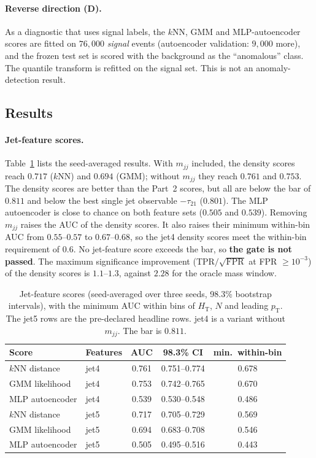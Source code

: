 \documentclass[11pt,a4paper]{article}
\newcommand{\pt}{\ensuremath{p_\mathrm{T}}\xspace}
\newcommand{\HT}{\ensuremath{H_\mathrm{T}}\xspace}
\newcommand{\mjj}{\ensuremath{m_{jj}}\xspace}
\newcommand{\tauTO}{\ensuremath{\tau_{21}}\xspace}
\begin{document}
\paragraph{Reverse direction (D).}
As a diagnostic that uses signal labels, the $k$NN, GMM and MLP-autoencoder scores are fitted on
$76{,}000$ \emph{signal} events (autoencoder validation: $9{,}000$ more), and the frozen test set is
scored with the background as the ``anomalous'' class. The quantile transform is refitted on the
signal set. This is not an anomaly-detection result.

\subsection{Results}
\label{sec:part3results}

\paragraph{Jet-feature scores.}
Table~\ref{tab:jet} lists the seed-averaged results. With \mjj included, the density scores reach
$0.717$ ($k$NN) and $0.694$ (GMM); without \mjj they reach $0.761$ and $0.753$. The density scores are
better than the Part~2 scores, but all are below the bar of $0.811$ and below the best single jet observable
$-\tauTO$ ($0.801$). The MLP autoencoder is close to chance on both feature sets ($0.505$ and
$0.539$). Removing \mjj raises the AUC of the density scores. It also raises their minimum within-bin AUC from
$0.55$--$0.57$ to $0.67$--$0.68$, so the jet4 density scores meet the within-bin requirement of $0.6$.
No jet-feature score exceeds the bar, so \textbf{the gate is not passed}. The maximum
significance improvement (TPR$/\sqrt{\mathrm{FPR}}$ at FPR $\geq10^{-3}$) of the density scores is $1.1$--$1.3$,
against $2.28$ for the oracle mass window.

\begin{table}[t]
\centering
\caption{Jet-feature scores (seed-averaged over three seeds, 98.3\% bootstrap intervals), with
the minimum AUC within bins of \HT, $N$ and leading \pt. The jet5 rows are the pre-declared headline
rows. jet4 is a variant without \mjj. The bar is $0.811$.}
\label{tab:jet}
\begin{tabular}{llccc}
\toprule
Score & Features & AUC & 98.3\% CI & min.\ within-bin \\
\midrule
$k$NN distance       & jet4 & 0.761 & 0.751--0.774 & 0.678 \\
GMM likelihood       & jet4 & 0.753 & 0.742--0.765 & 0.670 \\
MLP autoencoder      & jet4 & 0.539 & 0.530--0.548 & 0.486 \\
\midrule
$k$NN distance       & jet5 & 0.717 & 0.705--0.729 & 0.569 \\
GMM likelihood       & jet5 & 0.694 & 0.683--0.708 & 0.546 \\
MLP autoencoder      & jet5 & 0.505 & 0.495--0.516 & 0.443 \\
\bottomrule
\end{tabular}
\end{table}
\end{document}
